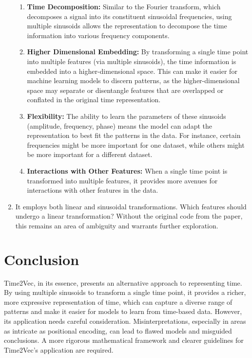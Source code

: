 \documentclass{tufte-handout}
\begin{document}
\begin{enumerate}
\begin{enumerate}
    	\item \textbf{Time Decomposition:} Similar to the Fourier transform, which decomposes a signal into its constituent sinusoidal frequencies, using multiple sinusoids allows the representation to decompose the time information into various frequency components.

    	\item \textbf{Higher Dimensional Embedding:} By transforming a single time point into multiple features (via multiple sinusoids), the time information is embedded into a higher-dimensional space. This can make it easier for machine learning models to discern patterns, as the higher-dimensional space may separate or disentangle features that are overlapped or conflated in the original time representation.

    	\item \textbf{Flexibility:} The ability to learn the parameters of these sinusoids (amplitude, frequency, phase) means the model can adapt the representation to best fit the patterns in the data. For instance, certain frequencies might be more important for one dataset, while others might be more important for a different dataset.

    	\item \textbf{Interactions with Other Features:} When a single time point is transformed into multiple features, it provides more avenues for interactions with other features in the data.
	\end{enumerate}

\item It employs both linear and sinusoidal transformations. Which features should undergo a linear transformation? Without the original code from the paper, this remains an area of ambiguity and warrants further exploration.
\end{enumerate}
\section{Conclusion}

Time2Vec, in its essence, presents an alternative approach to representing time. By using multiple sinusoids to transform a single time point, it provides a richer, more expressive representation of time, which can capture a diverse range of patterns and make it easier for models to learn from time-based data. However, its application needs careful consideration. Misinterpretations, especially in areas as intricate as positional encoding, can lead to flawed models and misguided conclusions. A more rigorous mathematical framework and clearer guidelines for Time2Vec's application are required.
\end{document}
